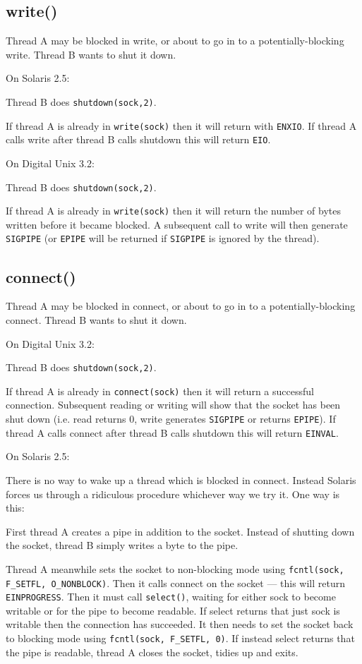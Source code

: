 \documentclass[11pt,twoside,a4paper]{article}
\begin{document}
\subsection{write()}

Thread A may be blocked in write, or about to go in to a
potentially-blocking write.  Thread B wants to shut it down.

On Solaris 2.5:

Thread B does \verb|shutdown(sock,2)|.

If thread A is already in \verb|write(sock)| then it will return with
\verb|ENXIO|.  If thread A calls write after thread B calls shutdown
this will return \verb|EIO|.


On Digital Unix 3.2:

Thread B does \verb|shutdown(sock,2)|.

If thread A is already in \verb|write(sock)| then it will return the
number of bytes written before it became blocked.  A subsequent call
to write will then generate \verb|SIGPIPE| (or \verb|EPIPE| will be
returned if \verb|SIGPIPE| is ignored by the thread).


\subsection{connect()}

Thread A may be blocked in connect, or about to go in to a
potentially-blocking connect.  Thread B wants to shut it down.


On Digital Unix 3.2:

Thread B does \verb|shutdown(sock,2)|.

If thread A is already in \verb|connect(sock)| then it will return a
successful connection.  Subsequent reading or writing will show that
the socket has been shut down (i.e. read returns 0, write generates
\verb|SIGPIPE| or returns \verb|EPIPE|).  If thread A calls connect
after thread B calls shutdown this will return \verb|EINVAL|.


On Solaris 2.5:

There is no way to wake up a thread which is blocked in connect.
Instead Solaris forces us through a ridiculous procedure whichever way
we try it.  One way is this:

First thread A creates a pipe in addition to the socket.  Instead of
shutting down the socket, thread B simply writes a byte to the pipe.

Thread A meanwhile sets the socket to non-blocking mode using
\verb|fcntl(sock,| \verb|F_SETFL, O_NONBLOCK)|.  Then it calls connect
on the socket --- this will return \verb|EINPROGRESS|.  Then it must
call \verb|select()|, waiting for either sock to become writable or
for the pipe to become readable.  If select returns that just sock is
writable then the connection has succeeded.  It then needs to set the
socket back to blocking mode using \verb|fcntl(sock, F_SETFL, 0)|.  If
instead select returns that the pipe is readable, thread A closes the
socket, tidies up and exits.
\end{document}
